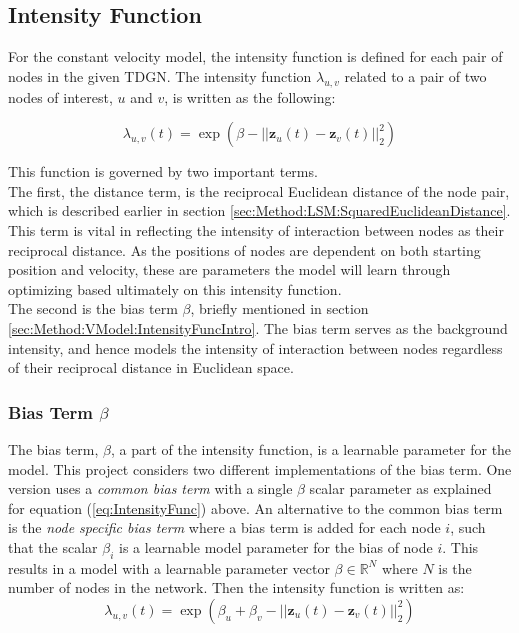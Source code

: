 \subsection{Intensity Function}
\label{sec:Method:IntensityFunc}

For the constant velocity model, the intensity function is defined for each pair of nodes in the given TDGN.
The intensity function $\lambda_{u,v}$ related to a pair of two nodes of interest, $u$ and $v$, is written as the following:

\begin{equation}
    \lambda_{u,v}(t)
    =
    \exp \left(\beta - ||\textbf{z}_u(t) - \textbf{z}_v(t)||_2^2\right)
    \label{eq:IntensityFunc}
\end{equation}

This function is governed by two important terms.
\\
The first, the distance term, is the reciprocal Euclidean distance of the node pair, which is described earlier in section \ref{sec:Method:LSM:SquaredEuclideanDistance}.
This term is vital in reflecting the intensity of interaction between nodes as their reciprocal distance.
As the positions of nodes are dependent on both starting position and velocity, these are parameters the model will learn through optimizing based ultimately on this intensity function.
\\
The second is the bias term $\beta$, briefly mentioned in section \ref{sec:Method:VModel:IntensityFuncIntro}.
The bias term serves as the background intensity, and hence models the intensity of interaction between nodes regardless of their reciprocal distance in Euclidean space. 


\subsubsection{Bias Term $\beta$}
\label{sec:Method:IntensityFunc:BiasTerm}

The bias term, $\beta$, a part of the intensity function, is a learnable parameter for the model.
This project considers two different implementations of the bias term. One version uses a \textit{common bias term} with a single $\beta$ scalar parameter as explained for equation (\ref{eq:IntensityFunc}) above.
An alternative to the common bias term is the \textit{node specific bias term} where a bias term is added for each node $i$, such that the scalar $\beta_i$ is a learnable model parameter for the bias of node $i$. This results in a model with a learnable parameter vector $\beta \in \mathbb{R}^N$ where $N$ is the number of nodes in the network. Then the intensity function is written as:
\begin{equation}
        \lambda_{u,v}(t)
    =
    \exp \left(\beta_u + \beta_v - ||\textbf{z}_u(t) - \textbf{z}_v(t)||_2^2\right)
    \label{eq:NodeBiasIntensityFunc}
\end{equation}

